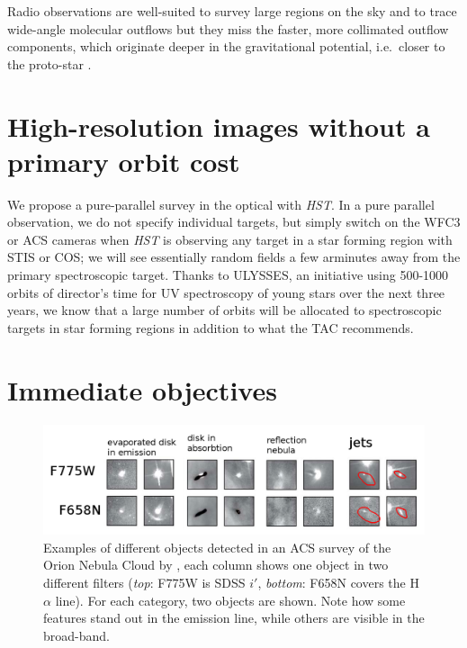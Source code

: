 \documentclass[12pt]{article}
\begin{document}
Radio observations are well-suited to survey large regions on the sky and to
trace wide-angle molecular outflows \citep[e.g.][]{2003MNRAS.341..707C} but
they miss the faster, more collimated outflow components, which originate
deeper in the gravitational potential, i.e.\ closer to the proto-star
\citep{2003ApJ...590L.107A}.


\section{High-resolution images without a primary orbit cost}
We propose a pure-parallel survey in the optical with \emph{HST}. In a pure
parallel observation, we do not specify individual targets, but simply switch
on the WFC3 or ACS cameras when \emph{HST} is observing any target in a star
forming region with STIS or COS; we will see essentially random fields a few
arminutes away from the primary spectroscopic target. Thanks to ULYSSES, an
initiative using 500-1000 orbits of director's time for UV spectroscopy of
young stars over the next three years, we know that a large number of orbits
will be allocated to spectroscopic targets in star forming regions in addition
to what the TAC recommends.

\section{Immediate objectives}


\begin{figure}
    \centering
    \includegraphics[width=\textwidth]{ONCACS.png}
    \caption{Examples of different objects detected in an ACS survey of the Orion Nebula Cloud by \citet{2008AJ....136.2136R}, each column shows one object in two different filters (\emph{top}: F775W is SDSS $i'$, \emph{bottom}: F658N covers the H$\alpha$ line). For each category, two objects are shown. Note how some features stand out in the emission line, while others are visible in the broad-band.}
    \label{fig:ONCACS}
\end{figure}
\end{document}
